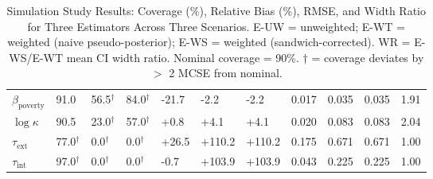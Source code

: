 \begin{table}[htbp]
\begin{tabular}{lllllllllll}
  $\beta_{\text{poverty}}$ & 91.0 & 56.5$^{\dagger}$ & 84.0$^{\dagger}$ & -21.7 & -2.2 & -2.2 & 0.017 & 0.035 & 0.035 & 1.91 \\ 
  $\log\kappa$ & 90.5 & 23.0$^{\dagger}$ & 57.0$^{\dagger}$ & +0.8 & +4.1 & +4.1 & 0.020 & 0.083 & 0.083 & 2.04 \\ 
  $\tau_{\text{ext}}$ & 77.0$^{\dagger}$ & 0.0$^{\dagger}$ & 0.0$^{\dagger}$ & +26.5 & +110.2 & +110.2 & 0.175 & 0.671 & 0.671 & 1.00 \\ 
  $\tau_{\text{int}}$ & 97.0$^{\dagger}$ & 0.0$^{\dagger}$ & 0.0$^{\dagger}$ & -0.7 & +103.9 & +103.9 & 0.043 & 0.225 & 0.225 & 1.00 \\ 
   \bottomrule
\end{tabular}
\caption{Simulation Study Results: Coverage (\%), Relative Bias (\%), RMSE, and Width Ratio for Three Estimators Across Three Scenarios. E-UW = unweighted; E-WT = weighted (naive pseudo-posterior); E-WS = weighted (sandwich-corrected). WR = E-WS/E-WT mean CI width ratio. Nominal coverage = 90\%. $\dagger$ = coverage deviates by $>$ 2 MCSE from nominal.} 
\end{table}
